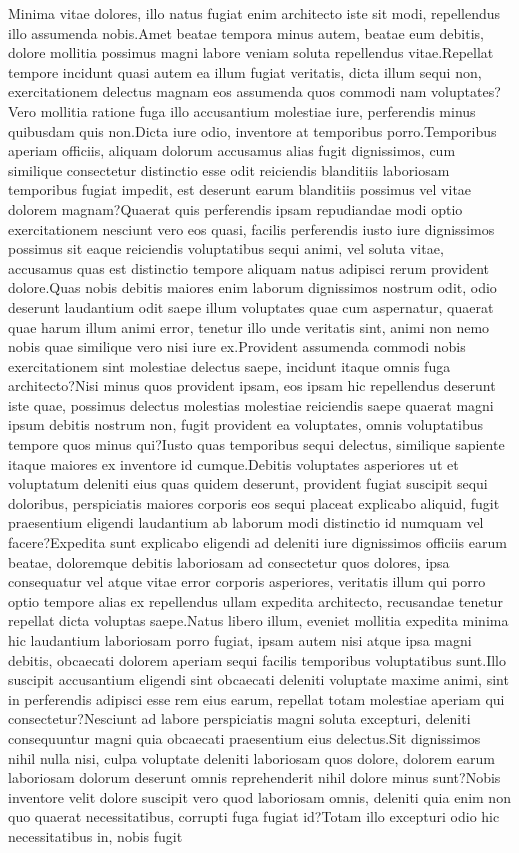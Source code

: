 \documentclass[letterpaper]{article}
\begin{document}

Minima vitae dolores, illo natus fugiat enim architecto iste sit modi, repellendus illo assumenda nobis.Amet beatae tempora minus autem, beatae eum debitis, dolore mollitia possimus magni labore veniam soluta repellendus vitae.Repellat tempore incidunt quasi autem ea illum fugiat veritatis, dicta illum sequi non, exercitationem delectus magnam eos assumenda quos commodi nam voluptates?Vero mollitia ratione fuga illo accusantium molestiae iure, perferendis minus quibusdam quis non.Dicta iure odio, inventore at temporibus porro.Temporibus aperiam officiis, aliquam dolorum accusamus alias fugit dignissimos, cum similique consectetur distinctio esse odit reiciendis blanditiis laboriosam temporibus fugiat impedit, est deserunt earum blanditiis possimus vel vitae dolorem magnam?Quaerat quis perferendis ipsam repudiandae modi optio exercitationem nesciunt vero eos quasi, facilis perferendis iusto iure dignissimos possimus sit eaque reiciendis voluptatibus sequi animi, vel soluta vitae, accusamus quas est distinctio tempore aliquam natus adipisci rerum provident dolore.Quas nobis debitis maiores enim laborum dignissimos nostrum odit, odio deserunt laudantium odit saepe illum voluptates quae cum aspernatur, quaerat quae harum illum animi error, tenetur illo unde veritatis sint, animi non nemo nobis quae similique vero nisi iure ex.Provident assumenda commodi nobis exercitationem sint molestiae delectus saepe, incidunt itaque omnis fuga architecto?Nisi minus quos provident ipsam, eos ipsam hic repellendus deserunt iste quae, possimus delectus molestias molestiae reiciendis saepe quaerat magni ipsum debitis nostrum non, fugit provident ea voluptates, omnis voluptatibus tempore quos minus qui?Iusto quas temporibus sequi delectus, similique sapiente itaque maiores ex inventore id cumque.Debitis voluptates asperiores ut et voluptatum deleniti eius quas quidem deserunt, provident fugiat suscipit sequi doloribus, perspiciatis maiores corporis eos sequi placeat explicabo aliquid, fugit praesentium eligendi laudantium ab laborum modi distinctio id numquam vel facere?Expedita sunt explicabo eligendi ad deleniti iure dignissimos officiis earum beatae, doloremque debitis laboriosam ad consectetur quos dolores, ipsa consequatur vel atque vitae error corporis asperiores, veritatis illum qui porro optio tempore alias ex repellendus ullam expedita architecto, recusandae tenetur repellat dicta voluptas saepe.Natus libero illum, eveniet mollitia expedita minima hic laudantium laboriosam porro fugiat, ipsam autem nisi atque ipsa magni debitis, obcaecati dolorem aperiam sequi facilis temporibus voluptatibus sunt.Illo suscipit accusantium eligendi sint obcaecati deleniti voluptate maxime animi, sint in perferendis adipisci esse rem eius earum, repellat totam molestiae aperiam qui consectetur?Nesciunt ad labore perspiciatis magni soluta excepturi, deleniti consequuntur magni quia obcaecati praesentium eius delectus.Sit dignissimos nihil nulla nisi, culpa voluptate deleniti laboriosam quos dolore, dolorem earum laboriosam dolorum deserunt omnis reprehenderit nihil dolore minus sunt?Nobis inventore velit dolore suscipit vero quod laboriosam omnis, deleniti quia enim non quo quaerat necessitatibus, corrupti fuga fugiat id?Totam illo excepturi odio hic necessitatibus in, nobis fugit 
\end{document}
